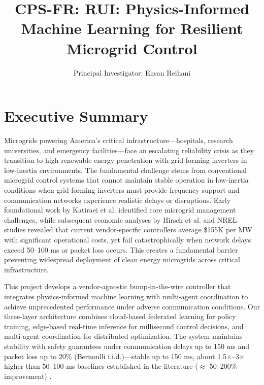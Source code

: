 \documentclass[12pt]{article}
\begin{document}
\vspace{-2cm}
\title{\Large\textbf{CPS-FR: RUI: Physics-Informed Machine Learning for Resilient Microgrid Control}}


\author{Principal Investigator: Ehsan Reihani}
\date{}
\vspace{-0.5cm}
\maketitle
\vspace{-0.5cm}
\section{Executive Summary}

Microgrids powering America's critical infrastructure---hospitals, research universities, and emergency facilities---face an escalating reliability crisis as they transition to high renewable energy penetration with grid-forming inverters in low-inertia environments. The fundamental challenge stems from conventional microgrid control systems that cannot maintain stable operation in low-inertia conditions when grid-forming inverters must provide frequency support and communication networks experience realistic delays or disruptions. Early foundational work by Katiraei et al. \cite{katiraei2008} identified core microgrid management challenges, while subsequent economic analyses by Hirsch et al. \cite{hirsch2018} and NREL studies \cite{giraldez2018} revealed that current vendor-specific controllers average \$155K per MW with significant operational costs, yet fail catastrophically when network delays exceed 50--100 ms or packet loss occurs. This creates a fundamental barrier preventing widespread deployment of clean energy microgrids across critical infrastructure.

This project develops a vendor-agnostic bump-in-the-wire controller that integrates physics-informed machine learning with multi-agent coordination to achieve unprecedented performance under adverse communication conditions. Our three-layer architecture combines cloud-based federated learning for policy training, edge-based real-time inference for millisecond control decisions, and multi-agent coordination for distributed optimization. The system maintains stability with safety guarantees under communication delays up to 150 ms and packet loss up to 20\% (Bernoulli i.i.d.)---stable up to 150 ms, about 1.5×--3× higher than 50--100 ms baselines established in the literature ($\approx$ 50--200\% improvement) \cite{bidram2014,simpson2013}.
\end{document}
